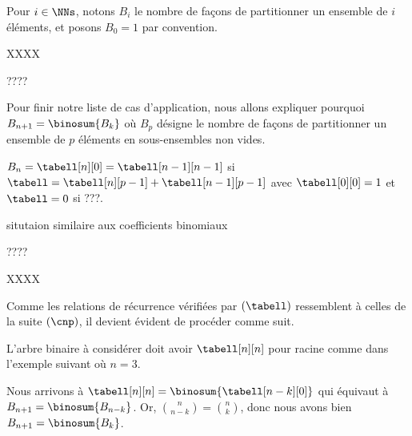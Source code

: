 Pour $i \in \NNs$, notons $B_i$ le nombre de façons de partitionner un ensemble de $i$ éléments, et posons $B_0 = 1$ par convention.

XXXX

????

Pour finir notre liste de cas d'application, nous allons expliquer pourquoi $B_{n+1} = \binosum{B_k}$ où $B_p$ désigne le nombre de façons de partitionner un ensemble de $p$ éléments en sous-ensembles non vides.

$B_n = \tabell[n][0] = \tabell[n-1][n-1]$
si
$\tabell = \tabell[n][p-1] + \tabell[n-1][p-1]$
avec
$\tabell[0][0] = 1$
et
$\tabell = 0$
si ???.

situtaion similaire aux coefficients binomiaux 

????

XXXX


Comme les relations de récurrence vérifiées par $(\tabell)$ ressemblent à celles de la suite $(\cnp)$,
il devient évident de procéder comme suit.

\explaintree{\tabell}{\tabell[n][p-1]}{\tabell[n-1][p-1]}%
            {\bellintertree}{}

L'arbre binaire à considérer doit avoir $\tabell[n][n]$ pour racine comme dans l'exemple suivant où $n = 3$.


Nous arrivons à
$\tabell[n][n] = \binosum{\tabell[n-k][0]}$
qui équivaut à
$B_{n+1} = \binosum{B_{n-k}}$.
Or, $\binom{n}{n-k} = \binom{n}{k}$, donc nous avons bien 
$B_{n+1} = \binosum{B_k}$.